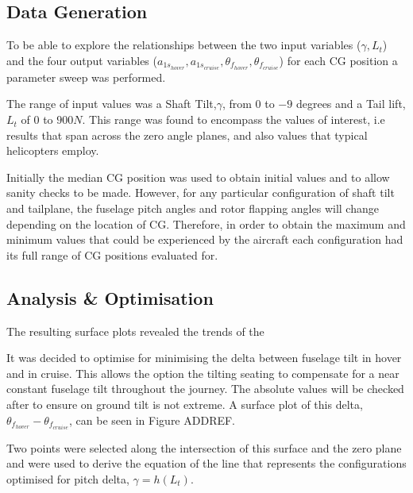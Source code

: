 \documentclass[11pt,a4paper]{article}
\begin{document}
\subsection{Data Generation}
To be able to explore the relationships between the two input variables ($\gamma,L_t$) and the  four output variables ($a_{1s_{hover}},a_{1s_{cruise}},\theta_{f_{hover}},\theta_{f_{cruise}}$) for each CG position a parameter sweep was performed.

The range of input values was a Shaft Tilt,$\gamma$, from $0$ to $-9$ degrees and a Tail lift, $L_t$ of $0$ to $900N$. This range was found to encompass the values of interest, i.e results that span across the zero angle planes, and also values that typical helicopters employ.

Initially the median CG position was used to obtain initial values and to allow sanity checks to be made. However, for any particular configuration of shaft tilt and tailplane, the fuselage pitch angles and rotor flapping angles will change depending on the location of CG. Therefore, in order to obtain the maximum and minimum values that could be experienced by the aircraft each configuration had its full range of CG positions evaluated for.

\subsection{Analysis \& Optimisation}

The resulting surface plots revealed the trends of the 



It was decided to optimise for minimising the delta between fuselage tilt in hover and in cruise. This allows the option the tilting seating to compensate for a near constant fuselage tilt throughout the journey. The absolute values will be checked after to ensure on ground tilt is not extreme. A surface plot of this delta, $\theta_{f_{hover}}-\theta_{f_{cruise}}$, can be seen in Figure ADDREF.

Two points were selected along the intersection of this surface and the zero plane and were used to derive the equation of the line that represents the configurations optimised for pitch delta, $\gamma=h(L_t)$.
\end{document}
